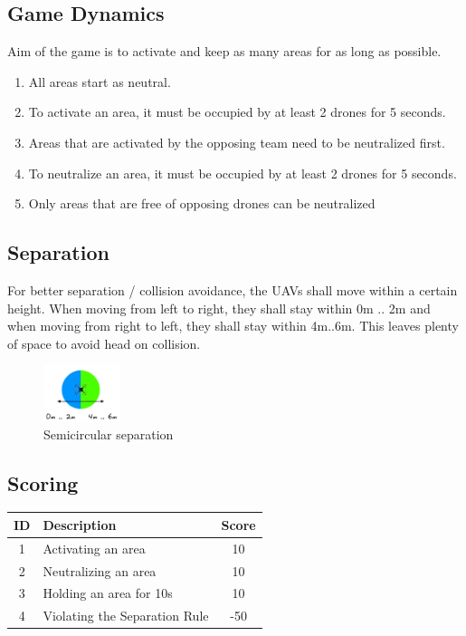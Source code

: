 \newpage
\subsection{Game Dynamics}
Aim of the game is to activate and keep as many areas for as long as possible.
\begin{enumerate}
	\item {All areas start as neutral.}
	\item {To activate an area, it must be occupied by at least 2 drones for 5 seconds.}
	\item {Areas that are activated by the opposing team need to be neutralized first.}
    \item {To neutralize an area, it must be occupied by at least 2 drones for 5 seconds.}
    \item {Only areas that are free of opposing drones can be neutralized}
\end{enumerate}

\subsection{Separation}
For better separation / collision avoidance, the UAVs shall move within a certain height. When moving from left to right, they shall stay within 0m .. 2m and when moving from right to left, they shall stay within 4m..6m. This leaves plenty of space to avoid head on collision.
\begin{figure}[h]
\centering
\includegraphics[width=0.2\textwidth]{figures/separation.png}
\caption{Semicircular separation}
\label{fig:separation}
\end{figure}

\subsection{Scoring}
\begin{center}
    \begin{tabular}{|c|l|c|}
        \hline
        ID & Description & Score \\
        \hline
        1 & Activating an area & 10 \\
        \hline
        2 & Neutralizing an area & 10 \\
        \hline
        3 & Holding an area for 10s & 10 \\
        \hline
        4 & Violating the Separation Rule & -50 \\
        \hline
    \end{tabular}
\end{center}
